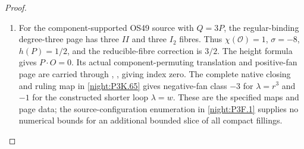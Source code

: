 \begin{proof}
\begin{enumerate}[label=\arabic*.]
pinching locus.  This follows from the actual primitive collapse,
so the order-two isotropy is retained in further orbit comparisons.
\item For the component-supported OS49 source with \(Q=3P\),
the regular-binding degree-three page has three \(II\) and three
\(I_2\) fibres.  Thus \(\chi(\mathcal O)=1\), \(\sigma=-8\),
\(h(P)=1/2\), and the reducible-fibre correction is \(3/2\).
The height formula gives \(P\cdot O=0\).  Its actual
component-permuting translation and positive-fan page are carried
through , , giving index zero.
The complete native closing and ruling map in \cref{night:P3K.65}
gives negative-fan class \(-3\) for \(\lambda=r^3\) and
\(-1\) for the constructed shorter loop \(\lambda=w\).
These are the specified maps and page data; the source-configuration
enumeration in \cref{night:P3F.1} supplies no numerical bounds
for an additional bounded slice of all compact fillings.
\end{enumerate}
\end{proof}




